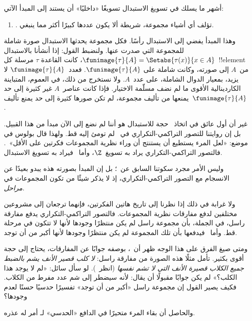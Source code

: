 \documentclass[../../../include/open-logic-section]{subfiles}
\begin{document}

أشهر ما يسلك في تسويغ الاستبدال تسويغًا «داخليًا» أن يستند إلى
المبدأ الآتي:
\begin{enumerate}
	\item[] \limofsize. تؤلف أي أشياء مجموعة، شريطة ألا يكون عددها
	كبيرًا أكثر مما ينبغي.
\end{enumerate}
وهذا المبدأ يفضي إلى الاستبدال رأسًا. فكل مجموعة يحدثها الاستبدال صورة
شاملة للمجموعة التي صدرت عنها. ولنضبط القول: إذا أنشأنا بالاستبدال
$\funimage{\tau}{A} = \Setabs{\tau(x)}{x \in A}$، كانت القاعدة
$\tau$ مرسلة كل~!!{element} من~$A$ إلى صورته، وكانت شاملة على
$\funimage{\tau}{A}$. فعدد~$\funimage{\tau}{A}$ لا يزيد، بمعيار
الدوال الشاملة، على عدد~$A$. ولا نستخرج من ذلك، في العموم، المتباينة
الكاردينالية الأقوى ما لم نضف مسلّمة الاختيار. فإذا كانت عناصر~$A$
غير كثيرة إلى حد يمنعها من تأليف مجموعة، لم تكن صورها كثيرة إلى حد
يمنع تأليف~$\funimage{\tau}{A}$.

غير أن أول عائق في اتخاذ~\limofsize{} حجة للاستبدال هو أننا لم نضع
إلى الآن مبدأ من هذا القبيل. بل إن روايتنا للتصور التراكمي-التكراري
في~ لم تومئ إليه قط. ولهذا
قال بولوس في موضع: «لعل المرء يستطيع أن يستنتج أن وراء نظرية
المجموعات فكرتين على الأقل»~\citeyearpar[p.~19]{Boolos1989}. فالتصور
التراكمي-التكراري يراد به تسويغ~$\Z$، وأما~\limofsize{} فيراد به
تسويغ الاستبدال.

وليس الأمر مجرد سكوتنا السابق عن~\limofsize؛ بل إن المبدأ بصورته
هذه يبدو بعيدًا عن الانسجام مع التصور التراكمي-التكراري، إذ لا يذكر
شيئًا من تكون المجموعات في \emph{مراحل}.

ولا غرابة في ذلك إذا نظرنا إلى تاريخ هاتين الفكرتين، فإنهما ترجعان
إلى مشروعين مختلفين لدفع مفارقات نظرية المجموعات. فالتصور
التراكمي-التكراري يدفع مفارقة راسل، في الجملة، بأن مجموعة راسل لم يكن
منتظرًا وجودها لأنها لا تتكون في مرحلة قط. وأما~\limofsize{} فيدفعها
بأن تلك المجموعة لم يكن منتظرًا وجودها لأنها أكبر من أن توجد.

ومتى صيغ الفرق على هذا الوجه ظهر أن~\limofsize{}، بوصفه جوابًا عن
المفارقات، يحتاج إلى حجة أقوى بكثير. تأمل مثلًا هذه الصورة من مفارقة
راسل: \emph{لا كلب قصير الأنف يشم بالضبط جميع الكلاب قصيرة الأنف
التي لا تشم نفسها} (انظر~). لو سأل سائل:
«لم لا يوجد هذا الكلب؟» لم يكن جوابًا مقبولًا أن يقال: لأنه سيضطر إلى
شم عدد مفرط من الكلاب. فكيف يصير القول إن مجموعة راسل «أكبر من أن
توجد» تفسيرًا حدسيًا حسنًا لعدم وجودها؟

والحاصل أن بقاء المرء متحيرًا في الدافع «الحدسي» لـ\limofsize{} أمر
له عذره.
\end{document}
